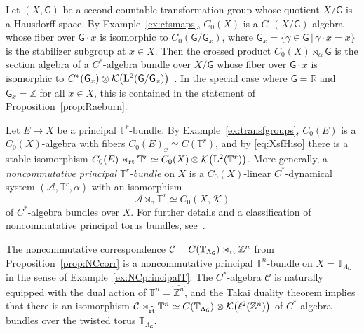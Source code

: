 \documentclass[pdftex]{sigma}
\numberwithin{equation}{section}
\newcommand{\Z}{\zed}
\newcommand{\CK}{\mathcal{K}}
\newcommand{\Ccal}{\mathcal{C}}
\newcommand{\sfG}{\mathsf{G}}
\newcommand{\Leb}{{\rm L}}
\newcommand{\rt}{{\rm rt}}
\newcommand{\zed}{{\mathbb Z}} %
\newcommand{\real}{{\mathbb R}} %
\newcommand{\torus}{{\mathbb T}} %
\def\alg{{\mathcal A}}
\begin{document}
\begin{Example}
\label{ex:transfgroups}
Let $(X,\sfG)$ be a second countable transformation group whose quotient $X/\sfG$ is a
Hausdorff space. By
Example~\ref{ex:ctsmaps},
$C_0(X)$ is a $C_0(X/\sfG)$-algebra whose fiber over $\sfG\cdot x$ is
isomorphic to
$C_0(\sfG/\sfG_x)$, where $\sfG_x=\{\gamma\in\sfG\,|\,\gamma\cdot x=x\}$ is the stabilizer subgroup at $x\in
X$. Then the crossed product $C_0(X)\rtimes_\alpha\sfG$ is the
section algebra of a $C^*$-algebra bundle over $X/\sfG$ whose fiber
over $\sfG\cdot x$ is isomorphic to
$C^*(\sfG_x)\otimes\CK\big(\Leb^2(\sfG/\sfG_x)\big)$~\cite{Williams1989}. In
the special case where
$\sfG=\real$ and $\sfG_x=\zed$ for all $x\in X$, this is contained in
the statement of Proposition~\ref{prop:Raeburn}.
\end{Example}

\begin{Example}\label{ex:NCprincipalT}
Let $E\to X$ be a principal $\torus^r$-bundle. By
Example~\ref{ex:transfgroups}, $C_0(E)$ is a $C_0(X)$-algebra
with fibers $C_0(E)_x\simeq
C(\torus^r)$, and by \eqref{eq:XsfHiso} there is a
stable isomorphism $C_0(E)\rtimes_\rt\torus^r\simeq
C_0(X)\otimes\CK\big(\Leb^2(\torus^r)\big)$. More generally, a
\emph{noncommutative principal $\torus^r$-bundle} on $X$ is a
$C_0(X)$-linear $C^*$-dynamical system $(\alg,\torus^r,\alpha)$ with
an isomorphism
\[
\alg\rtimes_\alpha\torus^r\simeq C_0(X,\CK)
\]
of $C^*$-algebra bundles over $X$. For further details and a
classification of noncommutative principal torus bundles,
see~\cite{Echterhoff2009,Hannabuss2010}.
\end{Example}

\begin{Example}
The noncommutative correspondence $\Ccal =
C(\torus_{\Lambda_\sfG})\rtimes_\rt\Z^n$ from
Proposition~\ref{prop:NCcorr} is a noncommutative principal
$\torus^n$-bundle on $X=\torus_{\Lambda_\sfG}$ in the sense of
Example~\ref{ex:NCprincipalT}: The $C^*$-algebra $\Ccal$ is naturally equipped with the
dual action of $\torus^n=\widehat{\Z^n}$, and the Takai duality
theorem implies that there is an isomorphism $\Ccal\rtimes_{\widehat{\rt}}\torus^n\simeq
C(\torus_{\Lambda_\sfG})\otimes\CK\big(\ell^2(\Z^n)\big)$ of
$C^*$-algebra bundles over the twisted torus $\torus_{\Lambda_\sfG}$.
\end{Example}
\end{document}
